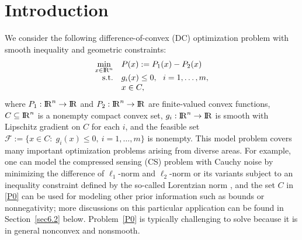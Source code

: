 \documentclass[10pt]{article}
\numberwithin{equation}{section}
\def\R{{\rm I\!R}}
\begin{document}
\section{Introduction}
We consider the following difference-of-convex (DC) optimization problem with smooth inequality and geometric constraints:
\begin{equation}\label{P0}
  \begin{array}{rl}
\min\limits_{x\in\R^n} & P(x) := P_1(x) - P_2(x)\\
{\rm s.t.} & g_i(x)\leq 0,~~ i = 1,\ldots, m,\\
           & x\in C,
  \end{array}
\end{equation}
where $P_1:\R^n\rightarrow\R$ and $P_2:\R^n\rightarrow\R$ are {\color{blue}finite-valued convex} functions, $C\subseteq \R^n$ is a nonempty compact convex set, $g_i:\R^n\rightarrow\R$ is smooth with Lipschitz gradient on $C$ for each $i$, and the feasible set $\mathcal{F} :=\{x\in C:\; g_i(x)\le 0, ~ i = 1,\ldots, m\}$ is nonempty. This model problem covers many important optimization problems arising from diverse areas. For example, one can model the compressed sensing (CS) problem with Cauchy noise by minimizing the difference of $\ell_1$-norm and $\ell_2$-norm \cite{YiLH15} or its variants subject to an inequality constraint defined by the so-called Lorentzian norm \cite{CaBA10}, and the set $C$ in \eqref{P0} can be used for modeling other prior information such as bounds or nonnegativity; more discussions on this particular application can be found in Section~\ref{sec6.2} below. Problem~\eqref{P0} is typically challenging to solve because it is in general nonconvex and nonsmooth.%
\end{document}
